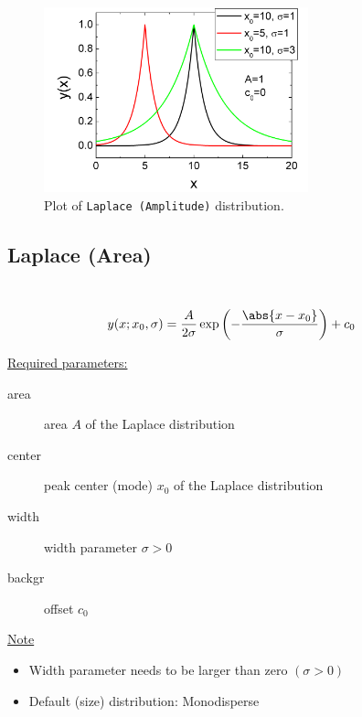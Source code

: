 \begin{figure}[htb]
\begin{center}
\includegraphics[width=0.6824\textwidth]{LaplaceAmplitude.png}
\end{center}
\caption{Plot of \texttt{Laplace (Amplitude)} distribution.}
\label{fig:LaplaceAmplitude}
\end{figure}

\clearpage
\subsection{Laplace (Area)} ~\\
\label{sec:LaplaceArea}
\begin{align}
y(x;x_0,\sigma) &= \frac{A}{2\sigma} \exp \left(
-\frac{\abs{x-x_0}}{\sigma}\right) + c_0
\end{align}

\uline{Required parameters:}
\begin{description}
    \item[area] area $A$ of the Laplace distribution
    \item[center] peak center (mode) $x_0$ of the Laplace distribution
    \item[width] width parameter $\sigma>0$
    \item[backgr] offset $c_0$
\end{description}

\uline{Note}
\begin{itemize}
  \item Width parameter needs to be larger than zero $(\sigma>0)$
  \item Default (size) distribution: Monodisperse
\end{itemize}


